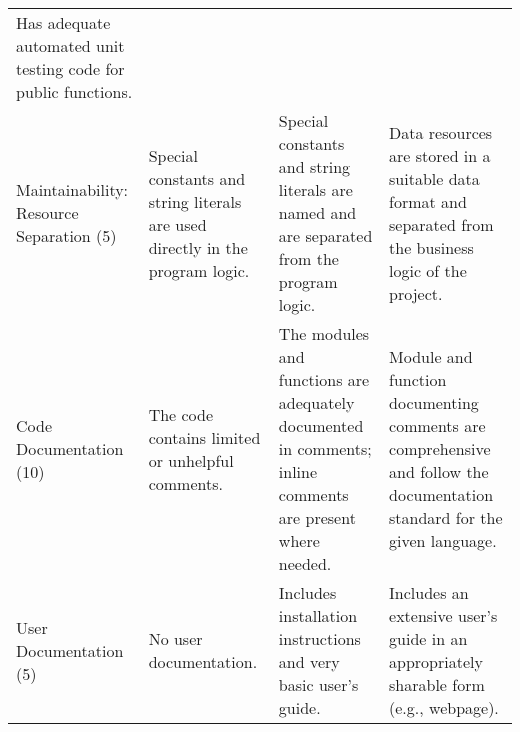 \documentclass[10pt,letter]{article}
\begin{document}
\begin{longtable}[]{@{}llll@{}}
\begin{minipage}[t]{0.25\columnwidth}
Has adequate automated unit testing code for public functions.\strut
\end{minipage}\tabularnewline
\begin{minipage}[t]{0.13\columnwidth}\raggedright\strut
Maintainability: Resource Separation (5)\strut
\end{minipage} & \begin{minipage}[t]{0.23\columnwidth}\raggedright\strut
Special constants and string literals are used directly in the program
logic.\strut
\end{minipage} & \begin{minipage}[t]{0.28\columnwidth}\raggedright\strut
Special constants and string literals are named and are separated from
the program logic.\strut
\end{minipage} & \begin{minipage}[t]{0.25\columnwidth}\raggedright\strut
Data resources are stored in a suitable data format and separated from
the business logic of the project.\strut
\end{minipage}\tabularnewline
\begin{minipage}[t]{0.13\columnwidth}\raggedright\strut
Code Documentation (10)\strut
\end{minipage} & \begin{minipage}[t]{0.23\columnwidth}\raggedright\strut
The code contains limited or unhelpful comments.\strut
\end{minipage} & \begin{minipage}[t]{0.28\columnwidth}\raggedright\strut
The modules and functions are adequately documented in comments; inline
comments are present where needed.\strut
\end{minipage} & \begin{minipage}[t]{0.25\columnwidth}\raggedright\strut
Module and function documenting comments are comprehensive and follow
the documentation standard for the given language.\strut
\end{minipage}\tabularnewline
\begin{minipage}[t]{0.13\columnwidth}\raggedright\strut
User Documentation (5)\strut
\end{minipage} & \begin{minipage}[t]{0.23\columnwidth}\raggedright\strut
No user documentation.\strut
\end{minipage} & \begin{minipage}[t]{0.28\columnwidth}\raggedright\strut
Includes installation instructions and very basic user's guide.\strut
\end{minipage} & \begin{minipage}[t]{0.25\columnwidth}\raggedright\strut
Includes an extensive user's guide in an appropriately sharable form
(e.g., webpage).\strut
\end{minipage}\tabularnewline
\bottomrule
\end{longtable}
\end{document}
